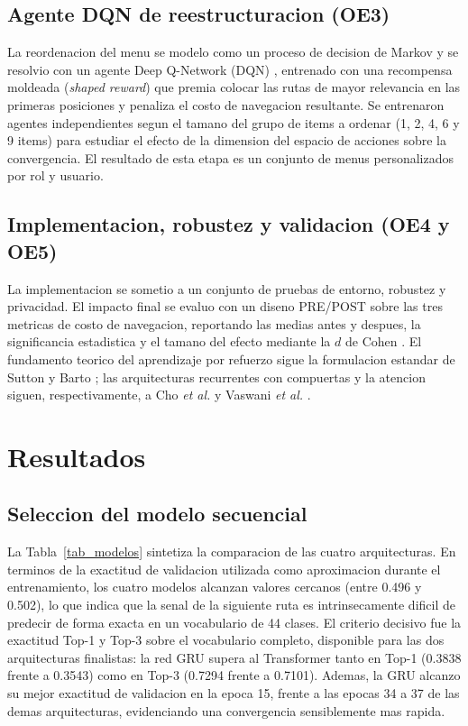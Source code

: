\documentclass[conference]{IEEEtran}
\begin{document}
\subsection{Agente DQN de reestructuracion (OE3)}
La reordenacion del menu se modelo como un proceso de decision de Markov y se resolvio con un agente Deep Q-Network (DQN) \cite{b_mnih}, entrenado con una recompensa moldeada (\textit{shaped reward}) que premia colocar las rutas de mayor relevancia en las primeras posiciones y penaliza el costo de navegacion resultante. Se entrenaron agentes independientes segun el tamano del grupo de items a ordenar (1, 2, 4, 6 y 9 items) para estudiar el efecto de la dimension del espacio de acciones sobre la convergencia. El resultado de esta etapa es un conjunto de menus personalizados por rol y usuario.

\subsection{Implementacion, robustez y validacion (OE4 y OE5)}
La implementacion se sometio a un conjunto de pruebas de entorno, robustez y privacidad. El impacto final se evaluo con un diseno PRE/POST sobre las tres metricas de costo de navegacion, reportando las medias antes y despues, la significancia estadistica y el tamano del efecto mediante la $d$ de Cohen \cite{b_cohen}. El fundamento teorico del aprendizaje por refuerzo sigue la formulacion estandar de Sutton y Barto \cite{b_sutton}; las arquitecturas recurrentes con compuertas y la atencion siguen, respectivamente, a Cho \textit{et al.} \cite{b_cho} y Vaswani \textit{et al.} \cite{b_vaswani}.

\section{Resultados}

\subsection{Seleccion del modelo secuencial}
La Tabla~\ref{tab_modelos} sintetiza la comparacion de las cuatro arquitecturas. En terminos de la exactitud de validacion utilizada como aproximacion durante el entrenamiento, los cuatro modelos alcanzan valores cercanos (entre 0.496 y 0.502), lo que indica que la senal de la siguiente ruta es intrinsecamente dificil de predecir de forma exacta en un vocabulario de 44 clases. El criterio decisivo fue la exactitud Top-1 y Top-3 sobre el vocabulario completo, disponible para las dos arquitecturas finalistas: la red GRU supera al Transformer tanto en Top-1 (0.3838 frente a 0.3543) como en Top-3 (0.7294 frente a 0.7101). Ademas, la GRU alcanzo su mejor exactitud de validacion en la epoca 15, frente a las epocas 34 a 37 de las demas arquitecturas, evidenciando una convergencia sensiblemente mas rapida.
\end{document}
